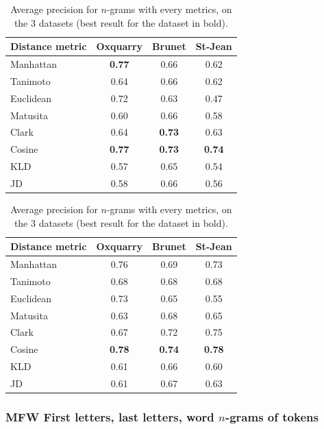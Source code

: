 \begin{table}
  \centering
  \caption{Average precision for $n$-grams with every metrics, on the 3 datasets (best result for the dataset in bold).}
  \label{tab:letter_ngrams}

  \begin{tabular}{l c c c}
    \toprule
    Distance metric & Oxquarry & Brunet & St-Jean \\
    \midrule
    Manhattan & \textbf{0.77} & 0.66 & 0.62 \\
    Tanimoto & 0.64 & 0.66 & 0.62 \\
    Euclidean & 0.72 & 0.63 & 0.47 \\
    Matusita & 0.60 & 0.66 & 0.58 \\
    Clark & 0.64 & \textbf{0.73} & 0.63 \\
    Cosine & \textbf{0.77} & \textbf{0.73} & \textbf{0.74} \\
    KLD & 0.57 & 0.65 & 0.54 \\
    JD & 0.58 & 0.66 & 0.56 \\
    \bottomrule
  \end{tabular}

  \vspace{0.5cm}

  \begin{tabular}{l c c c}
    \toprule
    Distance metric & Oxquarry & Brunet & St-Jean \\
    \midrule
    Manhattan & 0.76 & 0.69 & 0.73 \\
    Tanimoto & 0.68 & 0.68 & 0.68 \\
    Euclidean & 0.73 & 0.65 & 0.55 \\
    Matusita & 0.63 & 0.68 & 0.65 \\
    Clark & 0.67 & 0.72 & 0.75 \\
    Cosine & \textbf{0.78} & \textbf{0.74} & \textbf{0.78} \\
    KLD & 0.61 & 0.66 & 0.60 \\
    JD & 0.61 & 0.67 & 0.63 \\
    \bottomrule
  \end{tabular}
\end{table}

\subsubsection{MFW First letters, last letters, word $n$-grams of tokens}


